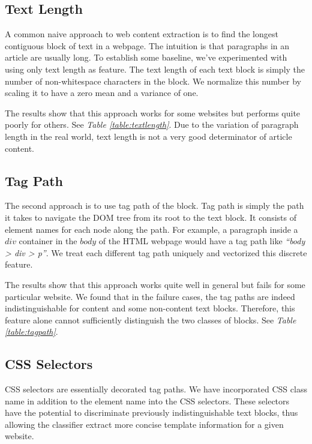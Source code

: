 \documentclass{acm_proc_article-sp}
\begin{document}
\subsection{Text Length}

A common naive approach to web content extraction is to find the longest contiguous block of text in a webpage. The intuition is that paragraphs in an article are usually long. To establish some baseline, we've experimented with using only text length as feature. The text length of each text block is simply the number of non-whitespace characters in the block. We normalize this number by scaling it to have a zero mean and a variance of one.

The results show that this approach works for some websites but performs quite poorly for others. See \emph{Table \ref{table:textlength}}. Due to the variation of paragraph length in the real world, text length is not a very good determinator of article content.

\subsection{Tag Path}

The second approach is to use tag path of the block. Tag path is simply the path it takes to navigate the DOM tree from its root to the text block. It consists of element names for each node along the path. For example, a paragraph inside a $div$ container in the $body$ of the HTML webpage would have a tag path like \emph{``body > div > p''}. We treat each different tag path uniquely and vectorized this discrete feature.

The results show that this approach works quite well in general but fails for some particular website. We found that in the failure cases, the tag paths are indeed indistinguishable for content and some non-content text blocks. Therefore, this feature alone cannot sufficiently distinguish the two classes of blocks. See \emph{Table \ref{table:tagpath}}.

\subsection{CSS Selectors}

CSS selectors are essentially decorated tag paths. We have incorporated CSS class name in addition to the element name into the CSS selectors. These selectors have the potential to discriminate previously indistinguishable text blocks, thus allowing the classifier extract more concise template information for a given website.
\end{document}
